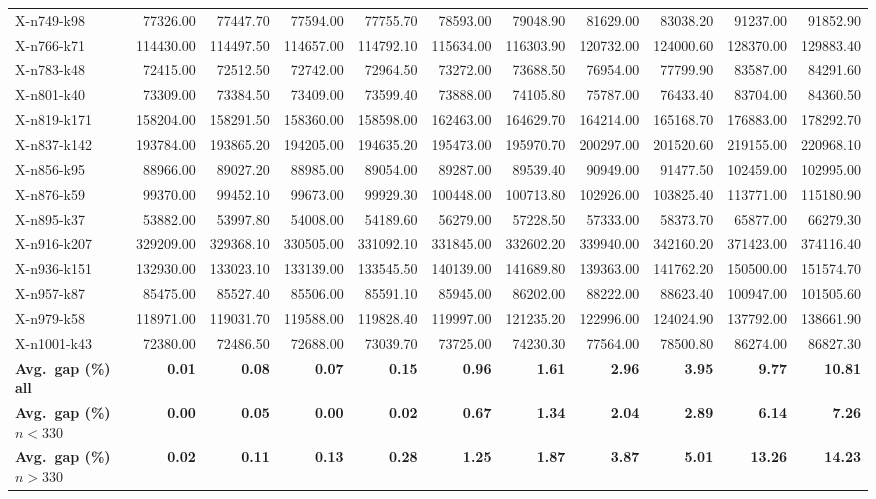 \documentclass[letterpaper]{article} %
\begin{document}
\begin{landscape}
\begin{longtable}{@{}l rr rr rr rr rr@{}}
X-n749-k98 & 77326.00 & 77447.70 & 77594.00 & 77755.70 & 78593.00 & 79048.90 & 81629.00 & 83038.20 & 91237.00 & 91852.90 \\
X-n766-k71 & 114430.00 & 114497.50 & 114657.00 & 114792.10 & 115634.00 & 116303.90 & 120732.00 & 124000.60 & 128370.00 & 129883.40 \\
X-n783-k48 & 72415.00 & 72512.50 & 72742.00 & 72964.50 & 73272.00 & 73688.50 & 76954.00 & 77799.90 & 83587.00 & 84291.60 \\
X-n801-k40 & 73309.00 & 73384.50 & 73409.00 & 73599.40 & 73888.00 & 74105.80 & 75787.00 & 76433.40 & 83704.00 & 84360.50 \\
X-n819-k171 & 158204.00 & 158291.50 & 158360.00 & 158598.00 & 162463.00 & 164629.70 & 164214.00 & 165168.70 & 176883.00 & 178292.70 \\
X-n837-k142 & 193784.00 & 193865.20 & 194205.00 & 194635.20 & 195473.00 & 195970.70 & 200297.00 & 201520.60 & 219155.00 & 220968.10 \\
X-n856-k95 & 88966.00 & 89027.20 & 88985.00 & 89054.00 & 89287.00 & 89539.40 & 90949.00 & 91477.50 & 102459.00 & 102995.00 \\
X-n876-k59 & 99370.00 & 99452.10 & 99673.00 & 99929.30 & 100448.00 & 100713.80 & 102926.00 & 103825.40 & 113771.00 & 115180.90 \\
X-n895-k37 & 53882.00 & 53997.80 & 54008.00 & 54189.60 & 56279.00 & 57228.50 & 57333.00 & 58373.70 & 65877.00 & 66279.30 \\
X-n916-k207 & 329209.00 & 329368.10 & 330505.00 & 331092.10 & 331845.00 & 332602.20 & 339940.00 & 342160.20 & 371423.00 & 374116.40 \\
X-n936-k151 & 132930.00 & 133023.10 & 133139.00 & 133545.50 & 140139.00 & 141689.80 & 139363.00 & 141762.20 & 150500.00 & 151574.70 \\
X-n957-k87 & 85475.00 & 85527.40 & 85506.00 & 85591.10 & 85945.00 & 86202.00 & 88222.00 & 88623.40 & 100947.00 & 101505.60 \\
X-n979-k58 & 118971.00 & 119031.70 & 119588.00 & 119828.40 & 119997.00 & 121235.20 & 122996.00 & 124024.90 & 137792.00 & 138661.90 \\
X-n1001-k43 & 72380.00 & 72486.50 & 72688.00 & 73039.70 & 73725.00 & 74230.30 & 77564.00 & 78500.80 & 86274.00 & 86827.30 \\
\midrule
\textbf{Avg.\ gap (\%) all} & \textbf{0.01} & \textbf{0.08} & \textbf{0.07} & \textbf{0.15} & \textbf{0.96} & \textbf{1.61} & \textbf{2.96} & \textbf{3.95} & \textbf{9.77} & \textbf{10.81} \\
\textbf{Avg.\ gap (\%) $n<330$} & \textbf{0.00} & \textbf{0.05} & \textbf{0.00} & \textbf{0.02} & \textbf{0.67} & \textbf{1.34} & \textbf{2.04} & \textbf{2.89} & \textbf{6.14} & \textbf{7.26} \\
\textbf{Avg.\ gap (\%) $n>330$} & \textbf{0.02} & \textbf{0.11} & \textbf{0.13} & \textbf{0.28} & \textbf{1.25} & \textbf{1.87} & \textbf{3.87} & \textbf{5.01} & \textbf{13.26} & \textbf{14.23} \\
\end{longtable}
\end{landscape}
\twocolumn
\end{document}
